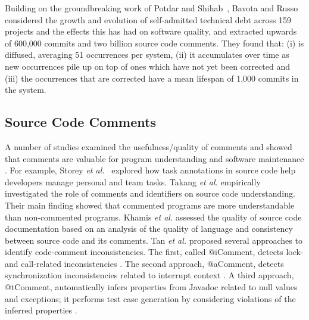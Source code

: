 Building on the groundbreaking work of Potdar and Shihab~\cite{ICSM_PotdarS14}, Bavota and Russo~\cite{bavota2016large} considered the growth and evolution of self-admitted technical debt across 159 projects and the effects this has had on software quality, and extracted upwards of 600,000 commits and two billion source code comments. They found that: (i) \SATD is diffused, averaging 51 occurrences per system, (ii) it accumulates over time as new occurrences pile up on top of ones which have not yet been corrected and (iii) the occurrences that are corrected have a mean lifespan of 1,000 commits in the system.\\


\subsection{Source Code Comments}

A number of studies examined the usefulness/quality of comments and showed that comments are valuable for program understanding and software maintenance \cite{TakangGM96,tan07icomment,lawrie2006leveraged}. For example, Storey \emph{et al.}~\cite{Storey:2008} explored how task annotations in source code help developers manage personal and team tasks. Takang {\em et al.} \cite{TakangGM96} empirically investigated the role of comments and identifiers on source code understanding. Their main finding showed that commented programs are more understandable than non-commented programs. Khamis {\em et al.} \cite{Khamis:2010} assessed the quality of source code documentation based on an analysis of the quality of language and consistency between source code and its comments. Tan {\em et al.} proposed several approaches to identify code-comment inconsistencies. The first, called @iComment, detects lock- and call-related inconsistencies \cite{tan07icomment}. The second approach, @aComment, detects synchronization inconsistencies related to interrupt context \cite{acomment}. A third approach, @tComment, automatically infers properties from Javadoc related to null values and exceptions; it performs test case generation by considering violations of the inferred properties \cite{tcomment}.\\


